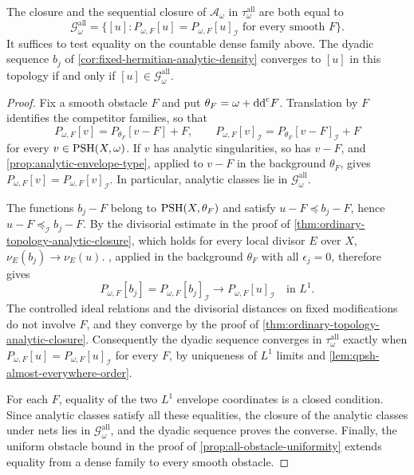 \begin{theorem}\label{thm:all-obstacle-analytic-closure}
The closure and the sequential closure of $\mathcal A_\omega$ in $\tau^{\mathrm{all}}_\omega$ are both equal to
\[
 \mathcal G^{\mathrm{all}}_\omega
 =\{[u]:P_{\omega,F}[u]=P_{\omega,F}[u]_{\mathcal I}
                      \text{ for every smooth }F\}.
\]
It suffices to test equality on the countable dense family above. The dyadic sequence $b_j$ of \cref{cor:fixed-hermitian-analytic-density} converges to $[u]$ in this topology if and only if $[u]\in\mathcal G^{\mathrm{all}}_\omega$.
\end{theorem}
\begin{proof}
Fix a smooth obstacle $F$ and put $\theta_F=\omega+\mathrm{dd}^{\mathrm{c}} F$. Translation by $F$ identifies the competitor families, so that
\[
 P_{\omega,F}[v]=P_{\theta_F}[v-F]+F,\qquad
 P_{\omega,F}[v]_{\mathcal I}=P_{\theta_F}[v-F]_{\mathcal I}+F
\]
for every $v\in\mathrm{PSH}(X,\omega)$. If $v$ has analytic singularities, so has $v-F$, and \cref{prop:analytic-envelope-type}, applied to $v-F$ in the background $\theta_F$, gives $P_{\omega,F}[v]=P_{\omega,F}[v]_{\mathcal I}$. In particular, analytic classes lie in $\mathcal G^{\mathrm{all}}_\omega$.

The functions $b_j-F$ belong to $\mathrm{PSH}(X,\theta_F)$ and satisfy $u-F\preceq b_j-F$, hence $u-F\preceq_{\mathcal I}b_j-F$. By the divisorial estimate in the proof of \cref{thm:ordinary-topology-analytic-closure}, which holds for every local divisor $E$ over $X$, $\nu_E(b_j)\to\nu_E(u)$. , applied in the background $\theta_F$ with all $\epsilon_j=0$, therefore gives
\[
 P_{\omega,F}[b_j]=P_{\omega,F}[b_j]_{\mathcal I}
       \longrightarrow P_{\omega,F}[u]_{\mathcal I}
       \quad\text{in }L^1.
\]
The controlled ideal relations and the divisorial distances on fixed modifications do not involve $F$, and they converge by the proof of \cref{thm:ordinary-topology-analytic-closure}. Consequently the dyadic sequence converges in $\tau^{\mathrm{all}}_\omega$ exactly when $P_{\omega,F}[u]=P_{\omega,F}[u]_{\mathcal I}$ for every $F$, by uniqueness of $L^1$ limits and \cref{lem:qpsh-almost-everywhere-order}.

For each $F$, equality of the two $L^1$ envelope coordinates is a closed condition. Since analytic classes satisfy all these equalities, the closure of the analytic classes under nets lies in $\mathcal G^{\mathrm{all}}_\omega$, and the dyadic sequence proves the converse. Finally, the uniform obstacle bound in the proof of \cref{prop:all-obstacle-uniformity} extends equality from a dense family to every smooth obstacle.
\end{proof}

